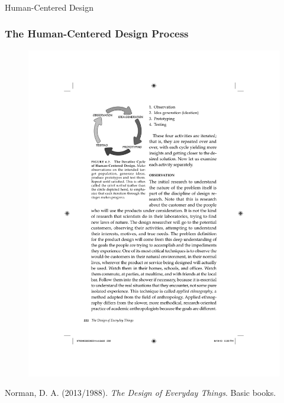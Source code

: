 \documentclass[screen, aspectratio=169]{beamer}
\begin{document}
%
\begin{frame}
\frametitle{}
\Huge{Human-Centered Design }
\end{frame}
%
\begin{frame}
\frametitle{The Human-Centered Design Process}
\begin{figure}
\includegraphics[scale=0.7]{img/Donald-Norman-human-centered-design.pdf}
\end{figure}
Norman, D. A. (2013/1988). \emph{The Design of Everyday Things}. Basic books. \cite{Norman.1988.psychology}
\end{frame}
%
\end{document}

